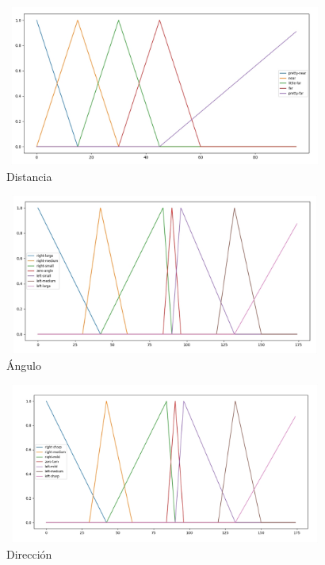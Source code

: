 \documentclass[a4paper,10pt]{article}
\begin{document}
	\begin{figure}[p]
		\begin{center}
			\includegraphics[width=400px, height=200px]{images/distance_plot.jpg}
		\end{center}
		\caption{Distancia \label{fig:distance_plot}}%
	\end{figure}	
	\begin{figure}[p]
		\begin{center}
			\includegraphics[width=400px, height=200px]{images/angle_plot.jpg}
		\end{center}
		\caption{Ángulo \label{fig:angle_plot}}%
	\end{figure}	
	\begin{figure}[p]
		\begin{center}
			\includegraphics[width=400px, height=200px]{images/direction_plot.jpg}
		\end{center}
		\caption{Dirección \label{fig:direction_plot}}%
	\end{figure}
	
\end{document}
